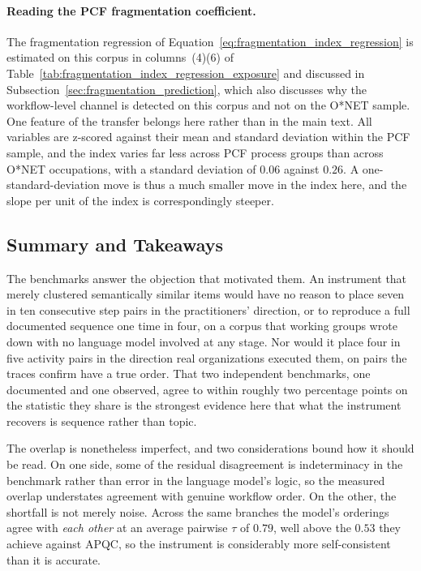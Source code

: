 \paragraph{Reading the PCF fragmentation coefficient.}
The fragmentation regression of Equation~\eqref{eq:fragmentation_index_regression} is estimated on this corpus in columns~(4)\textendash(6) of Table~\ref{tab:fragmentation_index_regression_exposure} and discussed in Subsection~\ref{sec:fragmentation_prediction}, which also discusses why the workflow-level channel is detected on this corpus and not on the O*NET sample.
One feature of the transfer belongs here rather than in the main text.
All variables are z-scored against their mean and standard deviation within the PCF sample, and the index varies far less across PCF process groups than across O*NET occupations, with a standard deviation of $0.06$ against $0.26$.
A one-standard-deviation move is thus a much smaller move in the index here, and the slope per unit of the index is correspondingly steeper.

\subsection{Summary and Takeaways}
\label{app:external_validation_discussion}

The benchmarks answer the objection that motivated them.
An instrument that merely clustered semantically similar items would have no reason to place seven in ten
consecutive step pairs in the practitioners' direction, or to reproduce a full documented sequence one time in
four, on a corpus that working groups wrote down with no language model involved at any stage.
Nor would it place four in five activity pairs in the direction real organizations executed them, on pairs the
traces confirm have a true order.
That two independent benchmarks, one documented and one observed, agree to within roughly two percentage
points on the statistic they share is the strongest evidence here that what the instrument recovers is
sequence rather than topic.

The overlap is nonetheless imperfect, and two considerations bound how it should be read.
On one side, some of the residual disagreement is indeterminacy in the benchmark rather than error in the
language model's logic, so the measured overlap understates agreement with genuine workflow order.
On the other, the shortfall is not merely noise.
Across the same branches the model's orderings agree with \emph{each other} at an average pairwise $\tau$ of
$0.79$, well above the $0.53$ they achieve against APQC, so the instrument is considerably more
self-consistent than it is accurate.

